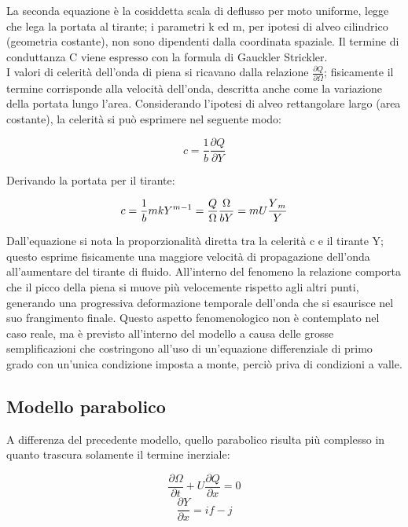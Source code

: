 \documentclass[12pt]{article} %
\begin{document}
\noindent La seconda equazione è la cosiddetta scala di deflusso per moto uniforme, legge che lega la portata al tirante; i parametri k ed m, per ipotesi di alveo cilindrico (geometria costante), non sono dipendenti dalla coordinata spaziale.
Il termine di conduttanza C viene espresso con la formula di Gauckler Strickler.\\
I valori di celerità dell’onda di piena si ricavano dalla relazione $\frac{\partial Q}{\partial \Omega}$;
fisicamente il termine corrisponde alla velocità dell’onda, descritta anche come la variazione della portata lungo l’area.
Considerando l’ipotesi di alveo rettangolare largo (area costante), la celerità si può esprimere nel seguente modo:

\begin{equation}
c=\frac{1}{b}\frac{\partial Q}{\partial Y}
\end{equation}

Derivando la portata per il tirante:

\begin{equation} 
c=\frac{1}{b}mkY^{m-1}=\frac{Q}{\Omega}\frac{\Omega}{bY}=mU\frac{Y\textsubscript{$m$}}{Y}
\end{equation}

\noindent Dall’equazione si nota la proporzionalità diretta tra la celerità c e il tirante Y; questo esprime fisicamente una maggiore velocità di propagazione dell’onda all’aumentare del tirante di fluido.
All’interno del fenomeno la relazione comporta che il picco della piena si muove più velocemente rispetto agli altri punti, generando una progressiva deformazione temporale dell’onda che si esaurisce nel suo frangimento finale.
Questo aspetto fenomenologico non è contemplato nel caso reale, ma è previsto all’interno del modello a causa delle grosse semplificazioni che costringono all’uso di un’equazione differenziale di primo grado con un’unica condizione imposta a monte, perciò priva di condizioni a valle.

\subsection{Modello parabolico}
\noindent A differenza del precedente modello, quello parabolico risulta più complesso in quanto trascura solamente il termine inerziale:

\begin{equation}
\frac{\partial \Omega }{\partial t}+U\frac{\partial Q}{\partial x}=0
\end{equation}
\begin{equation}
\frac{\partial Y }{\partial x}=if-j
\end{equation}
\end{document}
